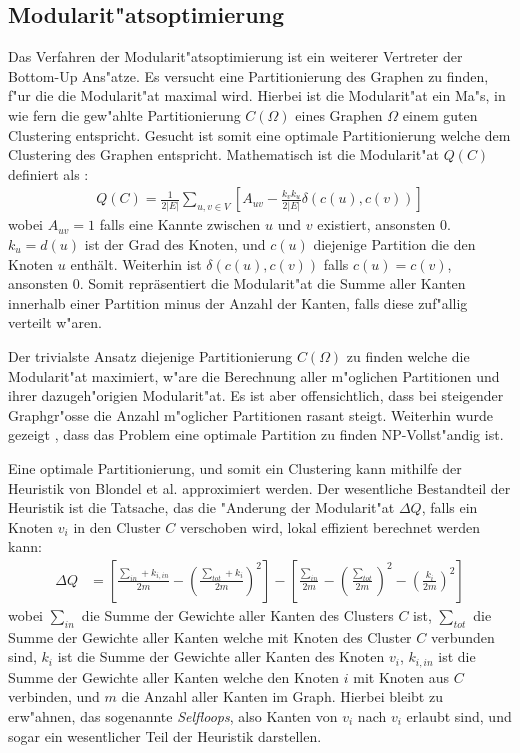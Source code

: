 \documentclass[journal]{vgtc}
\begin{document}
  
  \subsection{Modularit"atsoptimierung}
    \label{sec:modularity}
    Das Verfahren der Modularit"atsoptimierung ist ein weiterer Vertreter der Bottom-Up Ans"atze. Es versucht eine Partitionierung
    des Graphen zu finden, f"ur die die Modularit"at maximal wird. Hierbei ist die Modularit"at ein Ma"s, in wie fern die gew"ahlte
    Partitionierung $C(\Omega)$ eines Graphen $\Omega$ einem guten Clustering entspricht. Gesucht ist somit eine optimale Partitionierung welche dem Clustering des Graphen entspricht.
    Mathematisch ist die Modularit"at $Q(C)$ definiert als \cite{modularity}:
    \begin{align}
      Q(C)=\frac{1}{2|E|}\sum\limits_{u,v \in V}\left[ A_{uv} - \frac {k_vk_u}{2|E|}\delta \left( c(u), c(v)\right) \right]
    \end{align}
    wobei $A_{uv}=1$ falls eine Kannte zwischen $u$ und $v$ existiert, ansonsten 0. $k_u = d(u)$ ist der Grad des Knoten, und
    $c(u)$ diejenige Partition die den Knoten $u$ enthält. Weiterhin ist $\delta \left(c(u),c(v)\right)$ falls $c(u)=c(v)$,
    ansonsten 0.
    Somit repräsentiert die Modularit"at die Summe aller Kanten innerhalb einer Partition minus der Anzahl der Kanten, falls diese 
    zuf"allig verteilt w"aren.
    
    Der trivialste Ansatz diejenige Partitionierung $C(\Omega)$ zu finden welche die Modularit"at maximiert, w"are die Berechnung
    aller m"oglichen Partitionen und ihrer dazugeh"origien Modularit"at. Es ist aber offensichtlich, dass bei steigender 
    Graphgr"osse die Anzahl m"oglicher Partitionen rasant steigt. Weiterhin wurde gezeigt \cite{modularity_nphard}, dass das Problem
    eine optimale Partition zu finden NP-Vollst"andig ist.
    
    Eine optimale Partitionierung, und somit ein Clustering kann mithilfe der Heuristik von Blondel et al. \cite{modularity_heuristic}
    approximiert werden. Der wesentliche Bestandteil
    der Heuristik ist die Tatsache, das die "Anderung der Modularit"at $\Delta Q$, falls ein Knoten $v_i$ in den Cluster $C$ verschoben
    wird, lokal effizient berechnet werden kann:
    \begin{align}
     \Delta Q &= \left[ \frac{\sum_{in}+k_{i,in}}{2m} - \left( \frac{\sum_{tot}+k_i}{2m} \right)^2 \right] -
     \left[ \frac{\sum_{in}}{2m} - \left( \frac{\sum_{tot}}{2m} \right)^2 - \left( \frac{k_i}{2m} \right)^2 \right]
    \end{align}
    wobei $\sum_{in}$ die Summe der Gewichte aller Kanten des Clusters $C$ ist, $\sum_{tot}$ die Summe der Gewichte aller Kanten welche
    mit Knoten des Cluster $C$ verbunden sind, $k_i$ ist die Summe der Gewichte aller Kanten des Knoten $v_i$, $k_{i,in}$ ist die
    Summe der Gewichte aller Kanten welche den Knoten $i$ mit Knoten aus $C$ verbinden, und $m$ die Anzahl aller Kanten im Graph.
    Hierbei bleibt zu erw"ahnen, das sogenannte \emph{Selfloops}, also Kanten von $v_i$ nach $v_i$ erlaubt sind, und sogar
    ein wesentlicher Teil der Heuristik darstellen.
    
\end{document}
